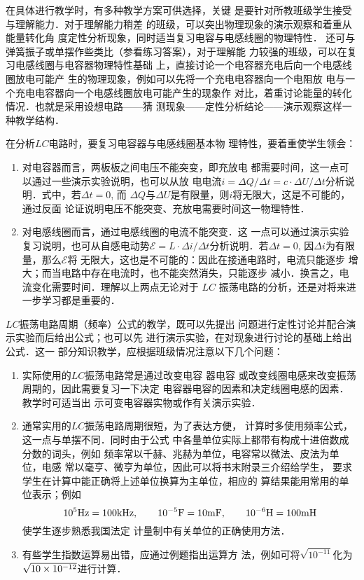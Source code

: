 在具体进行教学时，有多种教学方案可供选择，关键
是要针对所教班级学生接受与理解能力．对于理解能力稍差
的班级，可以突出物理现象的演示观察和着重从能量转化角
度定性分析现象，同时适当复习电容与电感线圈的物理特性．
还可与弹簧振子或单摆作些类比（参看练习答案），对于理解能
力较强的班级，可以在复习电感线圈与电容器物理特性基础
上，直接讨论一个电容器充电后向一个电感线圈放电可能产
生的物理现象，例如可以先将一个充电电容器向一个电阻放
电与一个充电电容器向一个电感线圈放电可能产生的现象作
对比，着重讨论能量的转化情况．也就是采用设想电路——猜
测现象——定性分析结论——演示观察这样一种教学结构．

在分析$LC$电路时，要复习电容器与电感线圈基本物
理特性，要着重使学生领会：
\begin{enumerate}
    \item 对电容器而言，两板板之间电压不能突变，即充放电
都需要时间，这一点可以通过一些演示实验说明，也可以从放
电电流$i=\Delta Q/\Delta t=c\cdot \Delta U/\Delta t$分析说明．式中，若$\Delta t=0$, 而
$\Delta Q$与$\Delta U$是有限量，则$i$将无限大，这是不可能的，通过反面
论证说明电压不能突变、充放电需要时间这一物理特性．
\item 对电感线圈而言，通过电感线圈的电流不能突变．这
一点可以通过演示实验复习说明，也可从自感电动势$\mathcal{E}=
L\cdot \Delta i/\Delta t$分析说明．若$\Delta t=0$, 因$\Delta i$为有限量，那么$\mathcal{E}$将
无限大，这也是不可能的：因此在接通电路时，电流只能逐步
增大；而当电路中存在电流时，也不能突然消失，只能逐步
减小．换言之，电流变化需要时间．理解以上两点无论对于
$LC$ 振荡电路的分析，还是对将来进一步学习都是重要的．
\end{enumerate}

$LC$振荡电路周期（频率）公式的教学，既可以先提出
问题进行定性讨论并配合演示实验而后给出公式；也可以先
进行演示实验，在对现象进行讨论的基础上给出公式．这一
部分知识教学，应根据班级情况注意以下几个问题：
\begin{enumerate}
\item 实际使用的$LC$振荡电路常是通过改变电容 器电容
或改变线圈电感来改变振荡周期的，因此需要复习一下决定
电容器电容的因素和决定线圈电感的因素．教学时可适当出
示可变电容器实物或作有关演示实验．
\item 通常实用的$LC$振荡电路周期很短，为了表达方便，
计算时多使用频率公式，这一点与单摆不同．同时由于公式
中各量单位实际上都带有构成十进倍数成分数的词头，例如
频率常以千赫、兆赫为单位，电容常以微法、皮法为单位，电感
常以毫亨、微亨为单位，因此可以将书末附录三介绍给学生，
要求学生在计算中能正确将上述单位换算为主单位，相应的
算结果能用常用的单位表示；例如
\[10^5{\rm Hz}=100{\rm kHz},\qquad 10^{-5}{\rm F}
=10{\rm mF},\qquad 10^{-6}{\rm H}=100{\rm mH}\]
使学生逐步熟悉我国法定
计量制中有关单位的正确使用方法．
\item 有些学生指数运算易出错，应通过例题指出运算方
法，例如可将$\sqrt{10^{-11}}$化为$\sqrt{10\times10^{-12}}$进行计算．
\end{enumerate}

